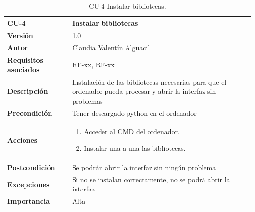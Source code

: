 \begin{table}[p]
	\centering
	\begin{tabularx}{\linewidth}{ p{} p{} }
		\toprule
		\textbf{CU-4} & \textbf{Instalar bibliotecas}\\
		\toprule
		\textbf{Versión}              & 1.0    \\
		\textbf{Autor}                & Claudia Valentín Alguacil \\
		\textbf{Requisitos asociados} & RF-xx, RF-xx \\
		\textbf{Descripción}          & Instalación de las bibliotecas necesarias para que el ordenador pueda procesar y abrir la interfaz sin problemas\\
		\textbf{Precondición}         & Tener descargado python en el ordenador \\
		\textbf{Acciones}             &
		\begin{enumerate}
			\def\labelenumi{\arabic{enumi}.}
			\tightlist
			\item Acceder al CMD del ordenador.
			\item Instalar una a una las bibliotecas.
		\end{enumerate}\\
		\textbf{Postcondición}        &  Se podrán abrir la interfaz sin ningún problema \\
		\textbf{Excepciones}          & Si no se instalan correctamente, no se podrá abrir la interfaz \\
		\textbf{Importancia}          & Alta \\
		\bottomrule
	\end{tabularx}
	\caption{CU-4 Instalar bibliotecas.}
\end{table}

